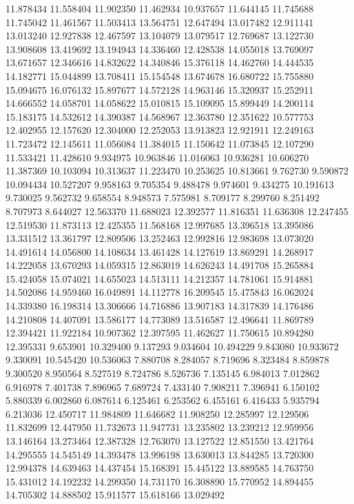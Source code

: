 11.878434
11.558404
11.902350
11.462934
10.937657
11.644145
11.745688
11.745042
11.461567
11.503413
13.564751
12.647494
13.017482
12.911141
13.013240
12.927838
12.467597
13.104079
13.079517
12.769687
13.122730
13.908608
13.419692
13.194943
14.336460
12.428538
14.055018
13.769097
13.671657
12.346616
14.832622
14.340846
15.376118
14.462760
14.444535
14.182771
15.044899
13.708411
15.154548
13.674678
16.680722
15.755880
15.094675
16.076132
15.897677
14.572128
14.963146
15.320937
15.252911
14.666552
14.058701
14.058622
15.010815
15.109095
15.899449
14.200114
15.183175
14.532612
14.390387
14.568967
12.363780
12.351622
10.577753
12.402955
12.157620
12.304000
12.252053
13.913823
12.921911
12.249163
11.723472
12.145611
11.056084
11.384015
11.150642
11.073845
12.107290
11.533421
11.428610
9.934975
10.963846
11.016063
10.936281
10.606270
11.387369
10.103094
10.313637
11.223470
10.253625
10.813661
9.762730
9.590872
10.094434
10.527207
9.958163
9.705354
9.488478
9.974601
9.434275
10.191613
9.730025
9.562732
9.658554
8.948573
7.575981
8.709177
8.299760
8.251492
8.707973
8.644027
12.563370
11.688023
12.392577
11.816351
11.636308
12.247455
12.519530
11.873113
12.425355
11.568168
12.997685
13.396518
13.395086
13.331512
13.361797
12.809506
13.252463
12.992816
12.983698
13.073020
14.491614
14.056800
14.108634
13.461428
14.127619
13.869291
14.268917
14.222058
13.670293
14.059315
12.863019
14.626243
14.491708
15.265884
15.424058
15.074021
14.655023
14.513111
14.212357
14.781061
15.914881
14.502086
14.959460
16.049891
14.112778
16.209545
15.475843
16.062024
14.339380
16.198314
13.306666
14.716886
13.907183
14.317839
14.176486
14.210808
14.407091
13.586177
14.773089
13.516587
12.496641
11.869789
12.394421
11.922184
10.907362
12.397595
11.462627
11.750615
10.894280
12.395331
9.653901
10.329400
9.137293
9.034604
10.494229
9.843080
10.933672
9.330091
10.545420
10.536063
7.880708
8.284057
8.719696
8.323484
8.859878
9.300520
8.950564
8.527519
8.724786
8.526736
7.135145
6.984013
7.012862
6.916978
7.401738
7.896965
7.689724
7.433140
7.908211
7.396941
6.150102
5.880339
6.002860
6.087614
6.125461
6.253562
6.455161
6.416433
5.935794
6.213036
12.450717
11.984809
11.646682
11.908250
12.285997
12.129506
11.832699
12.447950
11.732673
11.947731
13.235802
13.239212
12.959956
13.146164
13.273464
12.387328
12.763070
13.127522
12.851550
13.421764
14.295555
14.545149
14.393478
13.996198
13.630013
13.844285
13.720300
12.994378
14.639463
14.437454
15.168391
15.445122
13.889585
14.763750
15.431012
14.192232
14.299350
14.731170
16.308890
15.770952
14.894455
14.705302
14.888502
15.911577
15.618166
13.029492

